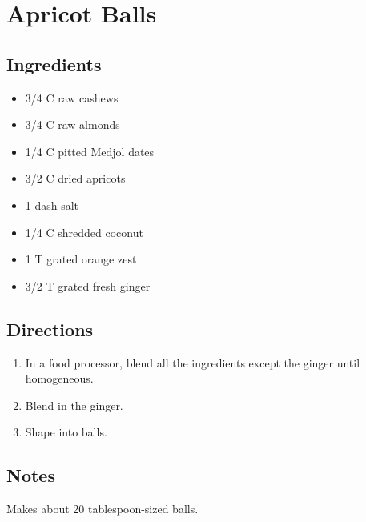 \documentclass[letterpaper,10pt,english]{sphinxmanual}
\begin{document}
\chapter{Apricot Balls}
\label{apricot_balls:apricot-balls}\label{apricot_balls::doc}

\section{Ingredients}
\label{apricot_balls:ingredients}\begin{itemize}
\item {} 
3/4     C   raw cashews

\item {} 
3/4     C   raw almonds

\item {} 
1/4     C   pitted Medjol dates

\item {} 
3/2     C   dried apricots

\item {} 
1   dash salt

\item {} 
1/4     C   shredded coconut

\item {} 
1   T   grated orange zest

\item {} 
3/2     T   grated fresh ginger

\end{itemize}


\section{Directions}
\label{apricot_balls:directions}\begin{enumerate}
\item {} 
In a food processor, blend all the ingredients except the ginger until homogeneous.

\item {} 
Blend in the ginger.

\item {} 
Shape into balls.

\end{enumerate}


\section{Notes}
\label{apricot_balls:notes}
Makes about 20 tablespoon-sized balls.
\end{document}

